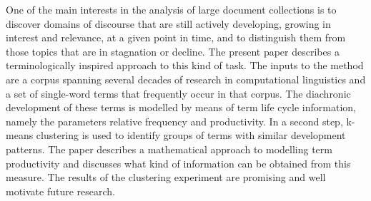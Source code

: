 One of the main interests in the analysis of large document collections is to discover domains of discourse that are still actively developing, growing in interest and relevance, at a given point in time, and to distinguish them from those topics that are in stagnation or decline. The present paper describes a terminologically inspired approach to this kind of task. The inputs to the method are a corpus spanning several decades of research in computational linguistics and a set of single-word terms that frequently occur in that corpus. The diachronic development of these terms is modelled by means of term life cycle information, namely the parameters relative frequency and productivity. In a second step, k-means clustering is used to identify groups of terms with similar development patterns. The paper describes a mathematical approach to modelling term productivity and discusses what kind of information can be obtained from this measure. The results of the clustering experiment are promising and well motivate future research.

